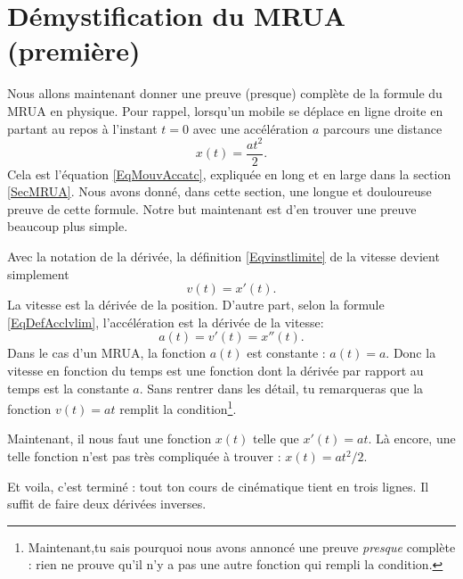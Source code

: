 \documentclass{article}
\begin{document}
					\section{Démystification du MRUA (première)}		\label{SecDemMRUAun}

Nous allons maintenant donner une preuve (presque) complète de la formule du MRUA en physique. Pour rappel, lorsqu'un mobile se déplace en ligne droite en partant au repos à l'instant $t=0$ avec une accélération $a$ parcours une distance
\begin{equation}
	x(t)=\frac{ at^2 }{ 2 }.
\end{equation}
Cela est l'équation \eqref{EqMouvAccatc}, expliquée en long et en large dans la section \ref{SecMRUA}. Nous avons donné, dans cette section, une longue et douloureuse preuve de cette formule. Notre but maintenant est d'en trouver une preuve beaucoup plus simple.

Avec la notation de la dérivée, la définition \eqref{Eqvinstlimite} de la vitesse devient simplement
\begin{equation}
	v(t)=x'(t).
\end{equation}
La vitesse est la dérivée de la position. D'autre part, selon la formule \eqref{EqDefAcclvlim}, l'accélération est la dérivée de la vitesse:
\begin{equation}
	a(t)=v'(t)=x''(t).
\end{equation}
Dans le cas d'un MRUA, la fonction $a(t)$ est constante : $a(t)=a$. Donc la vitesse en fonction du temps est une fonction dont la dérivée par rapport au temps est la constante $a$. Sans rentrer dans les détail, tu remarqueras que la fonction $v(t)=at$ remplit la condition\footnote{Maintenant,tu sais pourquoi nous avons annoncé une preuve \emph{presque} complète : rien ne prouve qu'il n'y a pas une autre fonction qui rempli la condition.}.

Maintenant, il nous faut une fonction $x(t)$ telle que $x'(t)=at$. Là encore, une telle fonction n'est pas très compliquée à trouver : $x(t)=at^2/2$.

Et voila, c'est terminé : tout ton cours de cinématique tient en trois lignes. Il suffit de faire deux dérivées inverses.

\end{document}
